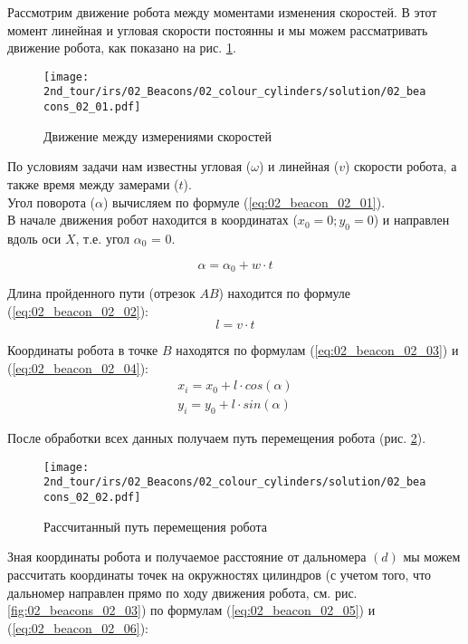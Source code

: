 \solutionSection

Рассмотрим движение робота между моментами изменения скоростей. В этот момент линейная и угловая скорости постоянны и мы можем рассматривать движение робота, как показано на рис. \ref{fig:02_beacons_02_01}.

\begin{figure}[h!]
	\centering
	\texttt{[image: 2nd\_tour/irs/02\_Beacons/02\_colour\_cylinders/solution/02\_beacons\_02\_01.pdf]}
	\caption{Движение между измерениями скоростей}
	\label{fig:02_beacons_02_01}
\end{figure}

По условиям задачи нам известны угловая ($\omega$) и линейная ($v$) скорости робота, а также время между замерами ($t$).\\
Угол поворота ($\alpha$) вычисляем по формуле (\ref{eq:02_beacon_02_01}). \\
В начале движения робот находится в координатах ($x_0 = 0; y_0 = 0$) и направлен вдоль оси $X$, т.е. угол $\alpha_0$ = 0.

\begin{equation}
\alpha = \alpha_0 + w \cdot t
\label{eq:02_beacon_02_01}
\end{equation}

Длина пройденного пути (отрезок $AB$) находится по формуле (\ref{eq:02_beacon_02_02}):
\begin{equation}
l = v \cdot t
\label{eq:02_beacon_02_02}
\end{equation}

Координаты робота в точке $B$ находятся по формулам (\ref{eq:02_beacon_02_03}) и (\ref{eq:02_beacon_02_04}):
\begin{eqnarray}
x_i = x_0 + l \cdot cos(\alpha)
\label{eq:02_beacon_02_03}\\
y_i = y_0 + l \cdot sin(\alpha)
\label{eq:02_beacon_02_04}
\end{eqnarray}

После обработки всех данных получаем путь перемещения робота (рис. \ref{fig:02_beacons_02_02}).
\begin{figure}[h!]
	\centering
	\texttt{[image: 2nd\_tour/irs/02\_Beacons/02\_colour\_cylinders/solution/02\_beacons\_02\_02.pdf]}
	\caption{Рассчитанный путь перемещения робота}
	\label{fig:02_beacons_02_02}
\end{figure}


Зная координаты робота и получаемое расстояние от дальномера $(d)$ мы можем рассчитать координаты точек на окружностях цилиндров (с учетом того, что дальномер направлен прямо по ходу движения робота, см. рис. \ref{fig:02_beacons_02_03}) по формулам (\ref{eq:02_beacon_02_05}) и (\ref{eq:02_beacon_02_06}):


